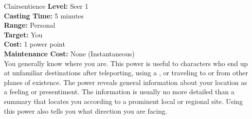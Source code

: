 {Clairsentience}
{
	\textbf{Level:}
	Seer 1\\
	\textbf{Casting Time:}
	5 minutes\\
	\textbf{Range:}
	Personal\\
	\textbf{Target:}
	You\\
	\textbf{Cost:}
	1 power point\\
	\textbf{Maintenance Cost:}
	None (Instantaneous)\\
}
{
	You generally know where you are. This power is useful to characters who end up at unfamiliar destinations after teleporting, using a , or traveling to or from other planes of existence. The power reveals general information about your location as a feeling or presentiment. The information is usually no more detailed than a summary that locates you according to a prominent local or regional site. Using this power also tells you what direction you are facing.
}
